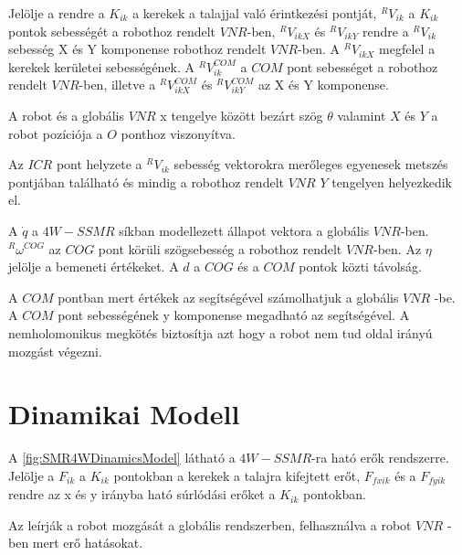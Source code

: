 Jelölje a rendre a $K_{ik}$ a kerekek a talajjal való érintkezési pontját, $^RV_{ik}$ a $K_{ik}$ pontok sebességét a robothoz rendelt $VNR$-ben, $^RV_{ikX}$ és $^RV_{ikY}$ rendre a $^RV_{ik}$ sebesség X és Y komponense robothoz rendelt $VNR$-ben. A $^RV_{ikX}$ megfelel a kerekek kerületei sebességének. A $^RV^{COM}_{ik}$ a $COM$ pont sebességet a robothoz rendelt $VNR$-ben, illetve a $^RV^{COM}_{ikX}$ és $^RV^{COM}_{ikY}$ az X és Y komponense. 

A robot és a globális $VNR$ x tengelye között bezárt szög $\theta$ valamint $X$ és $Y$ a robot pozíciója a $O$ ponthoz viszonyítva.

Az $ICR$ pont helyzete a $^RV_{ik}$ sebesség vektorokra merőleges egyenesek metszés pontjában található és mindig a robothoz rendelt $VNR$ $Y$ tengelyen helyezkedik el.

\renewcommand{\img}{SajatRobot/SzerkAbrak/robot4wSebModel_seb.jpg}
\renewcommand{\sources}{*}
\renewcommand{\captionn}{Kinematikai modell az $4W-SSMR$ típusú robotnak.}
\renewcommand{\figlabel}{SMR4WKinematics}


A $\dot q$ a $4W-SSMR$ síkban modellezett állapot vektora a globális $VNR$-ben. $^R \omega^{COG}$ az $COG$ pont körüli szögsebesség a robothoz rendelt $VNR$-ben. Az $\eta$ jelölje a bemeneti értékeket.
A $d$ a $COG$ és a $COM$ pontok közti távolság.

A $COM$ pontban mert értékek az  segítségével számolhatjuk a globális $VNR$ -be.
A $COM$ pont sebességének y komponense megadható az  segítségével.
A nemholomonikus megkötés  biztosítja azt hogy a robot nem tud oldal irányú mozgást végezni.





\section{Dinamikai Modell} 

A \ref{fig:SMR4WDinamicsModel} látható a $4W-SSMR$-ra ható erők rendszerre. Jelölje a $F_{ik}$ a $K_{ik}$ pontokban a kerekek a talajra kifejtett erőt, $F_{fxik}$ és a $F_{fyik}$ rendre az x és y irányba ható súrlódási erőket a $K_{ik}$ pontokban.

Az  leírják a robot mozgását a globális rendszerben, felhasználva a robot $VNR$ - ben mert erő hatásokat.

